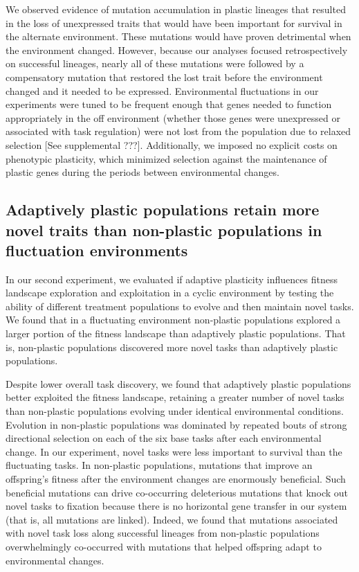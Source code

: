 We observed evidence of mutation accumulation in plastic lineages that resulted in the loss of unexpressed traits that would have been important for survival in the alternate environment.
These mutations would have proven detrimental when the environment changed.
However, because our analyses focused retrospectively on successful lineages, nearly all of these mutations were followed by a compensatory mutation that restored the lost trait before the environment changed and it needed to be expressed.
Environmental fluctuations in our experiments were tuned to be frequent enough that genes needed to function appropriately in the off environment (whether those genes were unexpressed or associated with task regulation) were not lost from the population due to relaxed selection [See supplemental ???].
Additionally, we imposed no explicit costs on phenotypic plasticity, which minimized selection against the maintenance of plastic genes during the periods between environmental changes.  

\vspace{0.25cm}
\subsection{Adaptively plastic populations retain more novel traits than non-plastic populations in fluctuation environments}

In our second experiment, we evaluated if adaptive plasticity influences fitness landscape exploration and exploitation in a cyclic environment by testing the ability of different treatment populations to evolve and then maintain novel tasks.
We found that in a fluctuating environment non-plastic populations explored a larger portion of the fitness landscape than adaptively plastic populations.
That is, non-plastic populations discovered more novel tasks than adaptively plastic populations.

Despite lower overall task discovery, we found that adaptively plastic populations better exploited the fitness landscape, retaining a greater number of novel tasks than non-plastic populations evolving under identical environmental conditions.
Evolution in non-plastic populations was dominated by repeated bouts of strong directional selection on each of the six base tasks after each environmental change. 
In our experiment, novel tasks were less important to survival than the fluctuating tasks.
In non-plastic populations, mutations that improve an offspring's fitness after the environment changes are enormously beneficial. 
Such beneficial mutations can drive co-occurring deleterious mutations that knock out novel tasks to fixation because there is no horizontal gene transfer in our system (that is, all mutations are linked).
Indeed, we found that mutations associated with novel task loss along successful lineages from non-plastic populations overwhelmingly co-occurred with mutations that helped offspring adapt to environmental changes.


